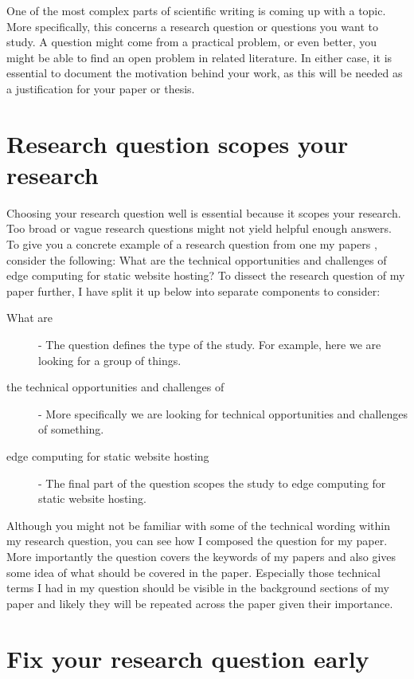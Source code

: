 One of the most complex parts of scientific writing is coming up with a topic.
More specifically, this concerns a research question or questions you want to study.
A question might come from a practical problem, or even better, you might be able to find an open problem in related literature.
In either case, it is essential to document the motivation behind your work, as this will be needed as a justification for your paper or thesis.

\section{Research question scopes your research}

Choosing your research question well is essential because it scopes your research.
Too broad or vague research questions might not yield helpful enough answers.
To give you a concrete example of a research question from one my papers \citep{vepsalainen2023implications}, consider the following: What are the technical opportunities and challenges of edge computing for static website hosting? To dissect the research question of my paper further, I have split it up below into separate components to consider:

\begin{description}
    \item[What are] - The question defines the type of the study. For example, here we are looking for a group of things.
    \item[the technical opportunities and challenges of] - More specifically we are looking for technical opportunities and challenges of something.
    \item[edge computing for static website hosting] - The final part of the question scopes the study to edge computing for static website hosting.
\end{description}

Although you might not be familiar with some of the technical wording within my research question, you can see how I composed the question for my paper.
More importantly the question covers the keywords of my papers and also gives some idea of what should be covered in the paper.
Especially those technical terms I had in my question should be visible in the background sections of my paper and likely they will be repeated across the paper given their importance.

\section{Fix your research question early}

